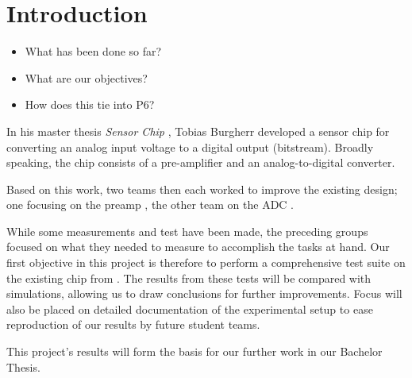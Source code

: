 \chapter{Introduction}
\label{ch:introduction}

\begin{itemize}\tightlist
    \item
        What has been done so far?
    \item
        What are our objectives?
    \item
        How does this tie into P6?
\end{itemize}

In his  master thesis \emph{Sensor Chip}  \cite{ref:burgherr}, Tobias Burgherr
developed a  sensor chip for converting  an analog input voltage  to a digital
output (bitstream). Broadly speaking, the chip consists of a pre-amplifier and
an analog-to-digital converter.

Based on this work, two teams then each worked to improve the existing design;
one  focusing on  the  preamp  \cite{ref:gloor}, the  other  team  on the  ADC
\cite{ref:baier}.

While some measurements and test have  been made, the preceding groups focused
on what  they needed  to measure  to accomplish the  tasks at  hand. Our first
objective in this  project is therefore to perform a  comprehensive test suite
on the  existing chip from  \cite{ref:burgherr}. The results from  these tests
will be compared with simulations, allowing us to draw conclusions for further
improvements. Focus  will also  be  placed on  detailed  documentation of  the
experimental  setup to  ease reproduction  of  our results  by future  student
teams.

This  project's results  will  form the  basis  for our  further  work in  our
Bachelor Thesis.

